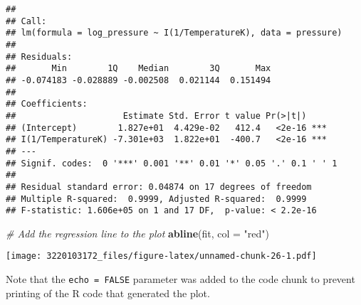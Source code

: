 \documentclass[
]{article}
\newenvironment{Shaded}{\begin{snugshade}}{\end{snugshade}}
\newcommand{\AttributeTok}[1]{\textcolor[rgb]{0.13,0.29,0.53}{#1}}
\newcommand{\CommentTok}[1]{\textcolor[rgb]{0.56,0.35,0.01}{\textit{#1}}}
\newcommand{\FunctionTok}[1]{\textcolor[rgb]{0.13,0.29,0.53}{\textbf{#1}}}
\newcommand{\NormalTok}[1]{#1}
\newcommand{\StringTok}[1]{\textcolor[rgb]{0.31,0.60,0.02}{#1}}
\begin{document}
\begin{verbatim}
## 
## Call:
## lm(formula = log_pressure ~ I(1/TemperatureK), data = pressure)
## 
## Residuals:
##       Min        1Q    Median        3Q       Max 
## -0.074183 -0.028889 -0.002508  0.021144  0.151494 
## 
## Coefficients:
##                     Estimate Std. Error t value Pr(>|t|)    
## (Intercept)        1.827e+01  4.429e-02   412.4   <2e-16 ***
## I(1/TemperatureK) -7.301e+03  1.822e+01  -400.7   <2e-16 ***
## ---
## Signif. codes:  0 '***' 0.001 '**' 0.01 '*' 0.05 '.' 0.1 ' ' 1
## 
## Residual standard error: 0.04874 on 17 degrees of freedom
## Multiple R-squared:  0.9999, Adjusted R-squared:  0.9999 
## F-statistic: 1.606e+05 on 1 and 17 DF,  p-value: < 2.2e-16
\end{verbatim}

\begin{Shaded}
\begin{Highlighting}[]
\CommentTok{\# Add the regression line to the plot}
\FunctionTok{abline}\NormalTok{(fit, }\AttributeTok{col =} \StringTok{"red"}\NormalTok{)}
\end{Highlighting}
\end{Shaded}

\texttt{[image: 3220103172\_files/figure-latex/unnamed-chunk-26-1.pdf]}

Note that the \texttt{echo\ =\ FALSE} parameter was added to the code
chunk to prevent printing of the R code that generated the plot.
\end{document}
